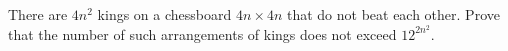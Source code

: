 \problem
There are $4 n^2$ kings on a chessboard $4 n \times 4 n$ that do not beat each
other.
Prove that the number of such arrangements of kings does not exceed
$12^{2n^2}$.
\solution
\endproblem
